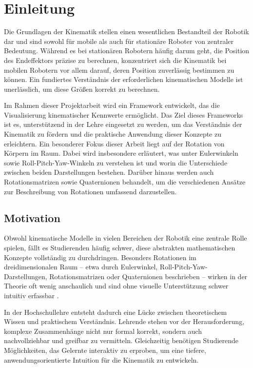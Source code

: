 \section{Einleitung}

Die Grundlagen der Kinematik stellen einen wesentlichen Bestandteil der Robotik dar und sind sowohl für mobile als auch für stationäre Roboter von zentraler Bedeutung.
Während es bei stationären Robotern häufig darum geht, die Position des Endeffektors präzise zu berechnen,
konzentriert sich die Kinematik bei mobilen Robotern vor allem darauf, deren Position zuverlässig bestimmen zu können.
Ein fundiertes Verständnis der erforderlichen kinematischen Modelle ist unerlässlich, um diese Größen korrekt zu berechnen.
\cite[57]{autonomous_mobile_robots}

Im Rahmen dieser Projektarbeit wird ein Framework entwickelt, das die Visualisierung kinematischer Kennwerte ermöglicht.
Das Ziel dieses Frameworks ist es, unterstützend in der Lehre eingesetzt zu werden, um das Verständnis der Kinematik zu fördern und die praktische Anwendung dieser Konzepte zu erleichtern.
Ein besonderer Fokus dieser Arbeit liegt auf der Rotation von Körpern im Raum. Dabei wird insbesondere erläutert,
was unter Eulerwinkeln sowie Roll-Pitch-Yaw-Winkeln zu verstehen ist und worin die Unterschiede zwischen beiden Darstellungen bestehen.
Darüber hinaus werden auch Rotationsmatrizen sowie Quaternionen behandelt, um die verschiedenen Ansätze zur Beschreibung von Rotationen umfassend darzustellen.


\subsection{Motivation}
Obwohl kinematische Modelle in vielen Bereichen der Robotik eine zentrale Rolle spielen, fällt es Studierenden häufig schwer,
diese abstrakten mathematischen Konzepte vollständig zu durchdringen. Besonders Rotationen im dreidimensionalen Raum – etwa durch Eulerwinkel,
Roll-Pitch-Yaw-Darstellungen, Rotationsmatrizen oder Quaternionen beschrieben – wirken in der Theorie oft wenig anschaulich und sind ohne visuelle
Unterstützung schwer intuitiv erfassbar \cite[94-95]{The_Second_Handbook_of_Research_on_the_Psychology_of_Mathematics_Education}.

In der Hochschullehre entsteht dadurch eine Lücke zwischen theoretischem Wissen und praktischem Verständnis.
Lehrende stehen vor der Herausforderung, komplexe Zusammenhänge nicht nur formal korrekt, sondern auch nachvollziehbar und greifbar zu vermitteln.
Gleichzeitig benötigen Studierende Möglichkeiten, das Gelernte interaktiv zu erproben, um eine tiefere, anwendungsorientierte Intuition für die Kinematik zu entwickeln.

